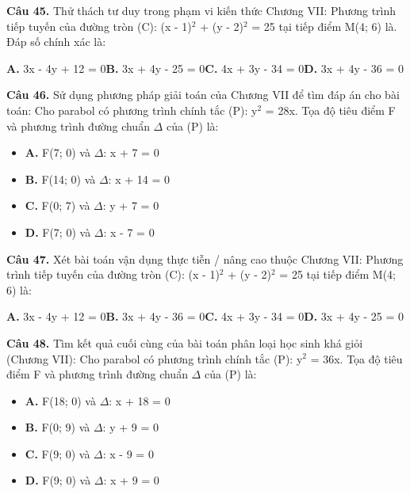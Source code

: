\documentclass[11pt,a4paper]{article}
\begin{document}
\textbf{\color{primary} Câu 45.} Thử thách tư duy trong phạm vi kiến thức Chương VII: Phương trình tiếp tuyến của đường tròn (C): (x - 1)$^2$ + (y - 2)$^2$ = 25 tại tiếp điểm M(4; 6) là. Đáp số chính xác là:\par
\hspace*{1.5em}\textbf{A.} 3x - 4y + 12 = 0\quad\quad \textbf{B.} 3x + 4y - 25 = 0\quad\quad \textbf{C.} 4x + 3y - 34 = 0\quad\quad \textbf{D.} 3x + 4y - 36 = 0\par\vspace{2pt}
\textbf{\color{primary} Câu 46.} Sử dụng phương pháp giải toán của Chương VII để tìm đáp án cho bài toán: Cho parabol có phương trình chính tắc (P): y$^2$ = 28x. Tọa độ tiêu điểm F và phương trình đường chuẩn $\Delta$ của (P) là:\par
\begin{itemize}\setlength{\itemsep}{1pt}\setlength{\parskip}{0pt}
  \item[] \textbf{A.} F(7; 0) và $\Delta$: x + 7 = 0
  \item[] \textbf{B.} F(14; 0) và $\Delta$: x + 14 = 0
  \item[] \textbf{C.} F(0; 7) và $\Delta$: y + 7 = 0
  \item[] \textbf{D.} F(7; 0) và $\Delta$: x - 7 = 0
\end{itemize}\vspace{2pt}
\textbf{\color{primary} Câu 47.} Xét bài toán vận dụng thực tiễn / nâng cao thuộc Chương VII: Phương trình tiếp tuyến của đường tròn (C): (x - 1)$^2$ + (y - 2)$^2$ = 25 tại tiếp điểm M(4; 6) là:\par
\hspace*{1.5em}\textbf{A.} 3x - 4y + 12 = 0\quad\quad \textbf{B.} 3x + 4y - 36 = 0\quad\quad \textbf{C.} 4x + 3y - 34 = 0\quad\quad \textbf{D.} 3x + 4y - 25 = 0\par\vspace{2pt}
\textbf{\color{primary} Câu 48.} Tìm kết quả cuối cùng của bài toán phân loại học sinh khá giỏi (Chương VII): Cho parabol có phương trình chính tắc (P): y$^2$ = 36x. Tọa độ tiêu điểm F và phương trình đường chuẩn $\Delta$ của (P) là:\par
\begin{itemize}\setlength{\itemsep}{1pt}\setlength{\parskip}{0pt}
  \item[] \textbf{A.} F(18; 0) và $\Delta$: x + 18 = 0
  \item[] \textbf{B.} F(0; 9) và $\Delta$: y + 9 = 0
  \item[] \textbf{C.} F(9; 0) và $\Delta$: x - 9 = 0
  \item[] \textbf{D.} F(9; 0) và $\Delta$: x + 9 = 0
\end{itemize}\vspace{2pt}
\end{document}
